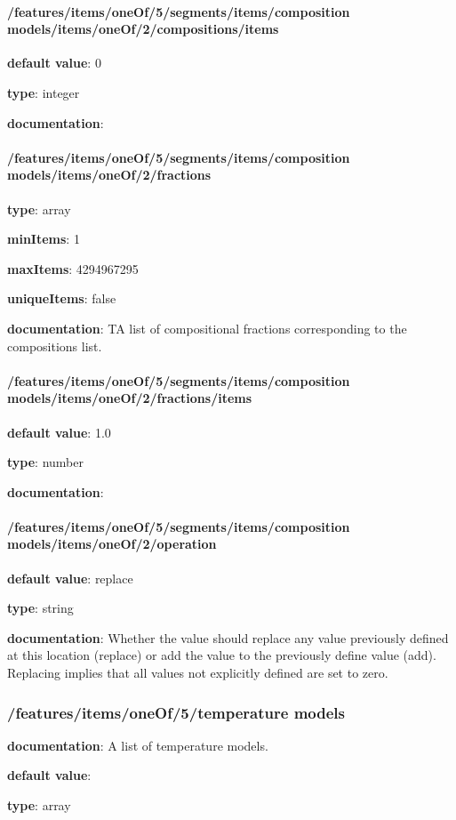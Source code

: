 \begin{itemized}
\paragraph{/features/items/oneOf/5/segments/items/composition models/items/oneOf/2/compositions/items} \begin{itemized}
\item {\bf default value}: 0
\item {\bf type}: integer
\item {\bf documentation}: 
\end{itemized}\end{itemized}\paragraph{/features/items/oneOf/5/segments/items/composition models/items/oneOf/2/fractions} \begin{itemized}
\item {\bf type}: array
\item {\bf minItems}: 1
\item {\bf maxItems}: 4294967295
\item {\bf uniqueItems}: false
\item {\bf documentation}: TA list of compositional fractions corresponding to the compositions list.
\paragraph{/features/items/oneOf/5/segments/items/composition models/items/oneOf/2/fractions/items} \begin{itemized}
\item {\bf default value}: 1.0
\item {\bf type}: number
\item {\bf documentation}: 
\end{itemized}\end{itemized}\paragraph{/features/items/oneOf/5/segments/items/composition models/items/oneOf/2/operation} \begin{itemized}
\item {\bf default value}: replace
\item {\bf type}: string
\item {\bf documentation}: Whether the value should replace any value previously defined at this location (replace) or add the value to the previously define value (add). Replacing implies that all values not explicitly defined are set to zero.
\end{itemized}\subsubsection{/features/items/oneOf/5/temperature models} \begin{itemized}
\item {\bf documentation}: A list of temperature models.
\item {\bf default value}: 
\item {\bf type}: array

\end{itemized}
